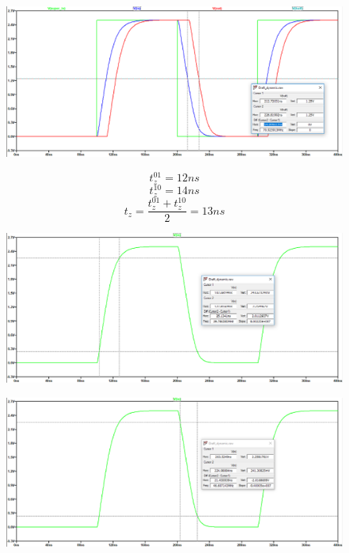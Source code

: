 \documentclass[a4paper,14pt]{article}
\begin{document}
\begin{figure}[H]
	\centering
	\includegraphics[width=\linewidth]{image/dyn_opt_zad10}
	\caption{}
	\label{fig:dynoptzad10}
\end{figure}

$$t_{z}^{01} = 12ns$$
$$t_{z}^{10} = 14ns$$
$$t_{z} = \dfrac{t_{z}^{01} + t_{z}^{10}}{2} = 13ns$$

\begin{figure}[H]
	\centering
	\includegraphics[width=\linewidth]{image/dyn_opt_f01}
	\caption{}
	\label{fig:dynoptf01}
\end{figure}

\begin{figure}[H]
	\centering
	\includegraphics[width=\linewidth]{image/dyn_opt_f10}
	\caption{}
	\label{fig:dynoptf10}
\end{figure}
\end{document}
